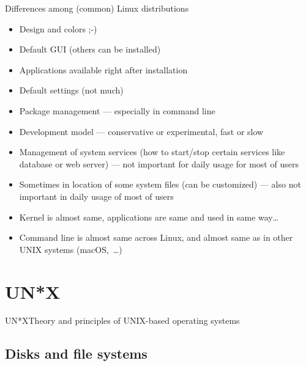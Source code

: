 \documentclass[compress, ucs, xelatex, 11pt, xcolor=svgnames, aspectratio=169,
	hyperref={
		bookmarks=true,
		unicode=true,
		colorlinks=true,
		pdftitle={Linux, command line and MetaCentrum},
		plainpages=false,
		pdfauthor={Vojtech Zeisek},
		pdfsubject={Course about use of Linux command line, writing shell scripts and using MetaCentrum of CESNET},
		pdfcreator={XeLaTeX},
		pdfkeywords={Linux, GNU, BASH, shell, command line, MetaCentrum},
		linkcolor=DarkRed, %
		anchorcolor=DarkBlue, %
		citecolor=Indigo, %
		filecolor=NavyBlue, %
		menucolor=DarkMagenta, %
		urlcolor=DarkBlue, %
		pdftex},
	url={hyphens, lowtilde} %
	]{beamer}
\begin{document}
\begin{frame}{Differences among (common) Linux distributions}
	\begin{itemize}
		\item Design and colors ;-)
		\item Default GUI (others can be installed)
		\item Applications available right after installation
		\item Default settings (not much)
		\item Package management --- especially in command line
		\item Development model --- conservative or experimental, fast or slow
		\item Management of system services (how to start/stop certain services like database or web server) --- not important for daily usage for most of users
		\item Sometimes in location of some system files (can be customized) --- also not important in daily usage of most of users
		\item Kernel is almost same, applications are same and used in same way\ldots
		\item Command line is almost same across Linux, and almost same as in other UNIX systems (macOS,~\ldots)
	\end{itemize}
\end{frame}

\section{UN*X}

\begin{frame}{UN*X}{Theory and principles of UNIX-based operating systems}
	\tableofcontents[currentsection, sectionstyle=show/hide, hideothersubsections]
\end{frame}

\subsection{Disks and file systems}
\end{document}
